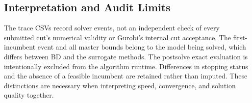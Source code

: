 \subsection{Interpretation and Audit Limits}\label{app:trace-limits}
The trace CSVs record solver events, not an independent check of every submitted cut's numerical validity or Gurobi's internal cut acceptance. The first-incumbent event and all master bounds belong to the model being solved, which differs between BD and the surrogate methods. The postsolve exact evaluation is intentionally excluded from the algorithm runtime. Differences in stopping status and the absence of a feasible incumbent are retained rather than imputed. These distinctions are necessary when interpreting speed, convergence, and solution quality together.
